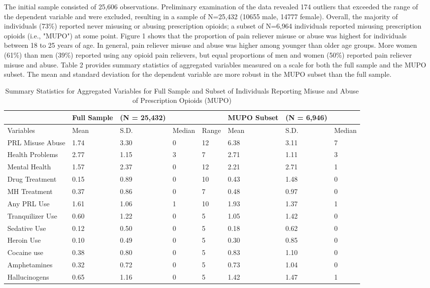 \documentclass[sigconf]{acmart}
\begin{document}
The initial sample consisted of 25,606 observations. Preliminary examination 
of the data revealed 174 outliers that exceeded the range of the dependent 
variable and were excluded, resulting in a sample of N=25,432 (10655 male, 
14777 female). Overall, the majority of individuals (73\%) reported never 
misusing or abusing prescription opioids; a subset of N=6,964 individuals 
reported misusing prescription opioids (i.e., "MUPO") at some point. Figure 1 
shows that the proportion of pain reliever misuse or abuse was highest for 
individuals between 18 to 25 years of age. In general, pain reliever misuse 
and abuse was higher among younger than older age groups. More women (61\%)
than men (39\%) reported using any opioid pain relievers, but equal proportions 
of men and women (50\%) reported pain reliever misuse and abuse. Table 2 
provides summary statistics of aggregated variables measured on a scale for 
both the full sample and the MUPO subset. The mean and standard deviation for 
the dependent variable are more robust in the MUPO subset than the full sample.  

\begin{table*}[ht]
  \caption{Summary Statistics for Aggregated Variables for Full Sample and 
  Subset of Individuals Reporting Misuse and Abuse of Prescription Opioids (MUPO)}
  \label{tab:freq}
  \begin{tabular}{llllllll}
    \toprule
     & Full Sample& (N = 25,432)&&& MUPO Subset& (N = 6,946)&  \\
    \midrule
    Variables & Mean& S.D.& Median& Range& Mean& S.D.& Median  \\
    \midrule
    PRL Misuse Abuse& 1.74& 3.30& 0& 12& 6.38& 3.11 & 7 \\
    Health Problems& 2.77& 1.15& 3& 7& 2.71& 1.11& 3  \\
    Mental Health& 1.57& 2.37& 0& 12& 2.21& 2.71& 1  \\
    Drug Treatment& 0.15& 0.89& 0& 10& 0.43& 1.48& 0  \\
    MH Treatment& 0.37& 0.86& 0& 7& 0.48& 0.97& 0  \\
    Any PRL Use& 1.61& 1.06& 1& 10& 1.93& 1.37& 1 \\
    Tranquilizer Use& 0.60& 1.22& 0& 5& 1.05& 1.42& 0  \\
    Sedative Use& 0.12& 0.50& 0& 5& 0.18& 0.62& 0  \\
    Heroin Use& 0.10& 0.49& 0& 5& 0.30& 0.85& 0  \\
    Cocaine use& 0.38& 0.80& 0& 5& 0.83& 1.10& 0 \\
    Amphetamines& 0.32& 0.72& 0& 5& 0.73& 1.04& 0  \\
    Hallucinogens& 0.65& 1.16& 0& 5& 1.42& 1.47& 1  \\
    \bottomrule
  \end{tabular}
\end{table*}
\end{document}
